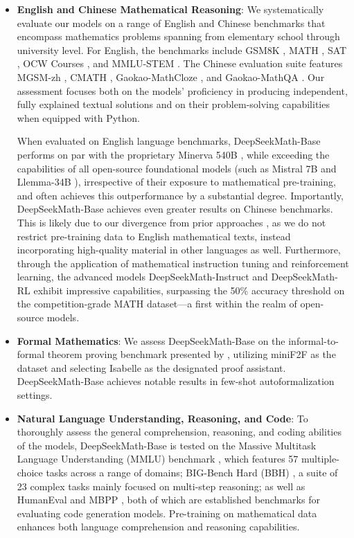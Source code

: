 \begin{itemize}[topsep=0pt]
    \item \textbf{English and Chinese Mathematical Reasoning}: We systematically evaluate our models on a range of English and Chinese benchmarks that encompass mathematics problems spanning from elementary school through university level. For English, the benchmarks include GSM8K \citep{gsm8k}, MATH \citep{MATH}, SAT \citep{llemma}, OCW Courses \citep{minerva}, and MMLU-STEM \citep{mmlu}. The Chinese evaluation suite features MGSM-zh \citep{mgsm}, CMATH \citep{wei2023cmath}, Gaokao-MathCloze \citep{agieval}, and Gaokao-MathQA \citep{agieval}. Our assessment focuses both on the models' proficiency in producing independent, fully explained textual solutions and on their problem-solving capabilities when equipped with Python.

When evaluated on English language benchmarks, DeepSeekMath-Base performs on par with the proprietary Minerva 540B \citep{minerva}, while exceeding the capabilities of all open-source foundational models (such as Mistral 7B \citep{mistral} and Llemma-34B \citep{llemma}), irrespective of their exposure to mathematical pre-training, and often achieves this outperformance by a substantial degree. Importantly, DeepSeekMath-Base achieves even greater results on Chinese benchmarks. This is likely due to our divergence from prior approaches \citep{minerva,llemma}, as we do not restrict pre-training data to English mathematical texts, instead incorporating high-quality material in other languages as well. Furthermore, through the application of mathematical instruction tuning and reinforcement learning, the advanced models DeepSeekMath-Instruct and DeepSeekMath-RL exhibit impressive capabilities, surpassing the 50\% accuracy threshold on the competition-grade MATH dataset—a first within the realm of open-source models.

\item \textbf{Formal Mathematics}: We assess DeepSeekMath-Base on the informal-to-formal theorem proving benchmark presented by \citep{dsp_proof}, utilizing miniF2F \citep{minif2f} as the dataset and selecting Isabelle \citep{isabelle} as the designated proof assistant. DeepSeekMath-Base achieves notable results in few-shot autoformalization settings.
\item \textbf{Natural Language Understanding, Reasoning, and Code}: To thoroughly assess the general comprehension, reasoning, and coding abilities of the models, DeepSeekMath-Base is tested on the Massive Multitask Language Understanding (MMLU) benchmark \citep{mmlu}, which features 57 multiple-choice tasks across a range of domains; BIG-Bench Hard (BBH) \citep{bbh}, a suite of 23 complex tasks mainly focused on multi-step reasoning; as well as HumanEval \citep{codex} and MBPP \citep{mbpp}, both of which are established benchmarks for evaluating code generation models. Pre-training on mathematical data enhances both language comprehension and reasoning capabilities.


\end{itemize}
